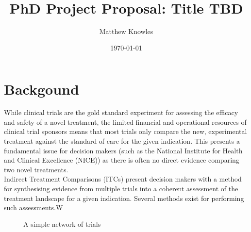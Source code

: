 \documentclass{amsart}
\title{PhD Project Proposal: Title TBD}
\author{Matthew Knowles}
\date{\today}
\theoremstyle{plain}
\theoremstyle{definition}
\theoremstyle{remark}
\begin{document}
\maketitle

\section{Backgound}
While clinical trials are the gold standard experiment for assessing the efficacy and safety of a novel treatment, the limited financial and operational resources of clinical trial sponsors means that most trials only compare the new, experimental treatment against the standard of care for the given indication. This presents a fundamental issue for decision makers (such as the National Institute for Health and Clinical Excellence (NICE)) as there is often no direct evidence comparing two novel treatments.\\

Indirect Treatment Comparisons (ITCs) present decision makers with a method for synthesising evidence from multiple trials into a coherent assessment of the treatment landscape for a given indication. Several methods exist for performing such assessments.W

\begin{figure}[h]
    \centering
    \caption{A simple network of trials}
    \label{fig:simpleNetwork}
\end{figure}
\end{document}
